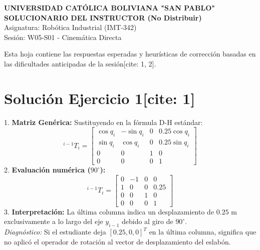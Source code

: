 \documentclass[11pt, a4paper]{article}
\begin{document}
\begin{center}
    \Large\textbf{\textcolor{ucbblue}{UNIVERSIDAD CATÓLICA BOLIVIANA "SAN PABLO"}}\\
    \vspace{0.2cm}
    \normalsize \textbf{SOLUCIONARIO DEL INSTRUCTOR (No Distribuir)} \\
    Asignatura: Robótica Industrial (IMT-342) \\
    Sesión: W05-S01 - Cinemática Directa
\end{center}

\vspace{0.4cm}
\begin{tcolorbox}[colback=red!5!white, colframe=red!75!black, title=\textbf{Notas Diagnósticas para el Docente}]
    Esta hoja contiene las respuestas esperadas y heurísticas de corrección basadas en las dificultades anticipadas de la sesión[cite: 1, 2].
\end{tcolorbox}
\vspace{0.4cm}

\section*{Solución Ejercicio 1[cite: 1]}
1. \textbf{Matriz Genérica:} Sustituyendo en la fórmula D-H estándar:
\begin{equation*}
    {}^{i-1}T_i = \begin{bmatrix}
    \cos q_i & -\sin q_i & 0 & 0.25\cos q_i \\
    \sin q_i & \cos q_i & 0 & 0.25\sin q_i \\
    0 & 0 & 1 & 0 \\
    0 & 0 & 0 & 1
    \end{bmatrix}
\end{equation*}
2. \textbf{Evaluación numérica ($90^\circ$):}
\begin{equation*}
    {}^{i-1}T_i = \begin{bmatrix}
    0 & -1 & 0 & 0 \\
    1 & 0 & 0 & 0.25 \\
    0 & 0 & 1 & 0 \\
    0 & 0 & 0 & 1
    \end{bmatrix}
\end{equation*}
3. \textbf{Interpretación:} La última columna indica un desplazamiento de $0.25\text{ m}$ exclusivamente a lo largo del eje $y_{i-1}$ debido al giro de $90^\circ$. \\
\textit{Diagnóstico:} Si el estudiante deja $[0.25, 0, 0]^T$ en la última columna, significa que no aplicó el operador de rotación al vector de desplazamiento del eslabón.
\end{document}
